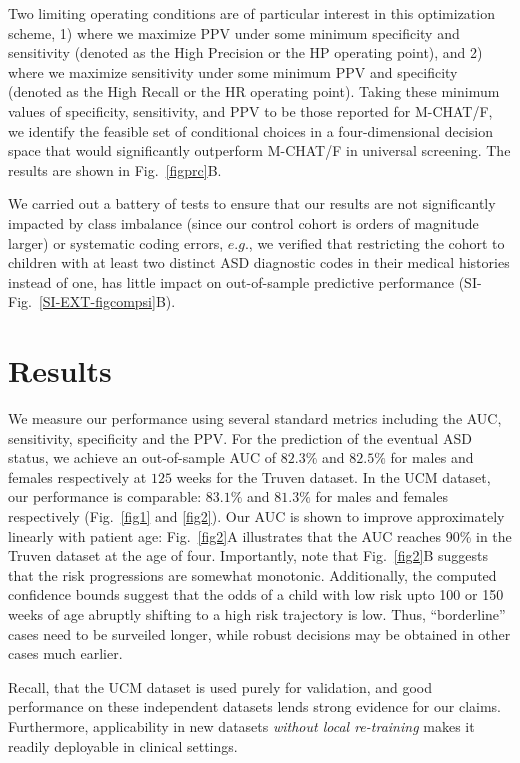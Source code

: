 \documentclass[onecolumn,10pt]{IEEEtran}
\begin{document}
Two limiting operating conditions are  of particular interest in this optimization scheme, 1) where we maximize PPV under some minimum specificity and sensitivity (denoted as  the High Precision or the HP operating point), and 2) where we maximize sensitivity under some minimum PPV and specificity (denoted as the High Recall or the HR  operating point). Taking these minimum values of specificity, sensitivity, and PPV to be those reported for  M-CHAT/F, we identify the feasible set of conditional choices in a four-dimensional decision space  that would  significantly outperform M-CHAT/F in universal screening. The results are shown in Fig.~\ref{figprc}B.

We carried out a battery of tests to ensure that our results are not significantly impacted by class imbalance (since our control cohort is orders of magnitude larger) or systematic coding errors, $e.g.$, we verified that restricting the \treatment cohort to children with at least two  distinct ASD diagnostic codes in their medical histories instead of one, has little impact on  out-of-sample predictive performance (SI-Fig.~\ref{SI-EXT-figcompsi}B). 

\section*{Results}
We measure our performance using several standard metrics including the AUC, sensitivity, specificity and the PPV. For the prediction of the eventual ASD  status, we achieve an out-of-sample AUC of $82.3\%$ and  $82.5\%$ for males and females respectively at $125$ weeks for the Truven dataset. In the UCM dataset, our performance is comparable: $83.1\%$ and $81.3\%$ for males and females respectively (Fig.~\ref{fig1} and \ref{fig2}).  Our AUC is shown to improve approximately  linearly  with patient age: Fig.~\ref{fig2}A illustrates that the  AUC  reaches 90\%  in the Truven dataset at the age of four. {\HCOL Importantly, note that Fig.~\ref{fig2}B suggests that the risk progressions are somewhat monotonic. Additionally, the computed confidence bounds suggest that the odds of a child with low risk upto 100 or 150 weeks of age abruptly shifting to a high risk trajectory is low. Thus,  ``borderline'' cases need to be surveiled longer, while robust decisions may be obtained in other cases much earlier.}

Recall, that the UCM dataset is used purely for validation, and good  performance on these independent datasets lends strong evidence for our claims. Furthermore, applicability in new datasets \textit{without local re-training} makes it readily  deployable in clinical settings.
\end{document}
